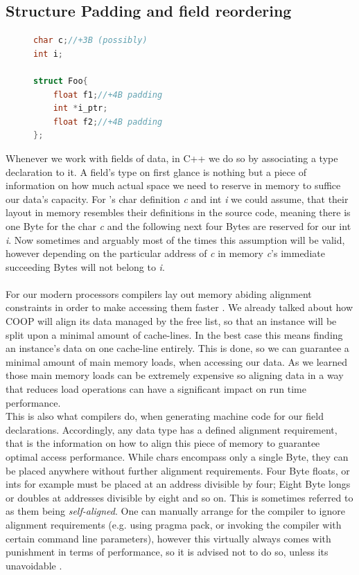 \subsection{Structure Padding and field reordering}\label{structure_padding_and_field_reordering}
\begin{figure}
\vspace{-1cm}
\begin{lstlisting}[language=C++,numbers=none,name={Example field declarations to elaborate on structure padding},label={padding}]
char c;//+3B (possibly)
int i;

struct Foo{
	float f1;//+4B padding
	int *i_ptr;
	float f2;//+4B padding
};
\end{lstlisting}
\end{figure}
Whenever we work with fields of data, in C++ we do so by associating a type declaration to it. A field's type on first glance is nothing but a piece of information on how much actual space we need to reserve in memory to suffice our data's capacity. For 's char definition \textit{c} and int \textit{i} we could assume, that their layout in memory resembles their definitions in the source code, meaning there is one Byte for the char \textit{c} and the following next four Bytes are reserved for our int \textit{i}. Now sometimes and arguably most of the times this assumption will be valid, however depending on the particular address of \textit{c} in memory \textit{c}'s immediate succeeding Bytes will not belong to \textit{i}.\\\\
For our modern processors compilers lay out memory abiding alignment constraints in order to make accessing them faster . We already talked about how COOP will align its data managed by the free list, so that an instance will be split upon a minimal amount of cache-lines. In the best case this means finding an instance's data on one cache-line entirely. This is done, so we can guarantee a minimal amount of main memory loads, when accessing our data. As we learned those main memory loads can be extremely expensive so aligning data in a way that reduces load operations can have a significant impact on run time performance.\\
This is also what compilers do, when generating machine code for our field declarations. Accordingly, any data type has a defined alignment requirement, that is the information on how to align this piece of memory to guarantee optimal access performance. While chars encompass only a single Byte, they can be placed anywhere without further alignment requirements. Four Byte floats, or ints for example must be placed at an address divisible by four; Eight Byte longs or doubles at addresses divisible by eight and so on. This is sometimes referred to as them being \textit{self-aligned}. One can manually arrange for the compiler to ignore alignment requirements (e.g. using pragma pack, or invoking the compiler with certain command line parameters), however this virtually always comes with punishment in terms of performance, so it is advised not to do so, unless its unavoidable .\\
